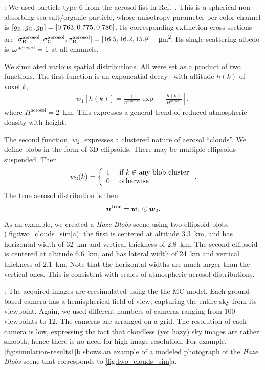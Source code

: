 \documentclass[10pt,letterpaper]{article}
\begin{document}
: We used particle-type 6 from the aerosol list
in Ref.~\cite{Martonchik2009}. This is a spherical non-absorbing
sea-salt/organic particle, whose anisotropy parameter per color
channel is $[g_{\rm R},g_{\rm G},g_{\rm B}]=[0.763,0.775,0.786]$. Its
corresponding extinction cross sections are $[\sigma^{\rm
  aerosol}_{\rm R}, \sigma^{\rm aerosol}_{\rm G}, \sigma^{\rm
  aerosol}_{\rm
  B}]=[16.5,16.2,15.9]$~\si[sticky-per]{\per\micro\meter\squared}.
Its single-scattering albedo is $\varpi^{\rm aerosol}=1$ at all
channels.

We simulated various spatial distributions. All were set as a product
of two functions. The first function is an exponential
decay~\cite{Levi1980} with altitude $h(k)$ of voxel $k$,
\begin{align}
  w_1[h(k)] = \frac{1} {n^{sea level}}
  \exp\left[-\frac{h(k)}{H^\mathrm{aerosol}}\right],
\end{align}
where $H^\mathrm{aerosol}=2$~\si{\km}. This expresses a general trend
of reduced atmospheric density with height.

The second function, $w_2$, expresses a clustered nature of aerosol
``clouds''. We define blobs in the form of 3D ellipsoids. There may be
multiple ellipsoids suspended.  Then
\begin{equation}
  w_2(k) =
  \left\{
    \begin{array}{ll}
      1  & \mbox{ if $k\in$ any blob cluster} \\
      0  & \mbox{ otherwise}
      \label{eq:f2}
    \end{array}
  \right.
  .
  \hspace{-0.05cm}
\end{equation}
The true aerosol distribution is then
\begin{equation}
  \label{eq:ntrue}
  {\bm n}^{\rm true}={\bm w}_1\odot {\bm w}_2  .
  \hspace{-0.05cm}
\end{equation}
As an example, we created a {\em Haze Blobs} scene using two ellipsoid
blobs (\cref{fig:two_clouds_sim}a): the first is centered at altitude
\SI{3.3}{\km}, and has horizontal width of \SI{32}{\km} and vertical
thickness of \SI{2.8}{\km}. The second ellipsoid is centered at
altitude \SI{6.6}{\km}, and has lateral width of \SI{24}{\km} and
vertical thickness of \SI{2.1}{\km}. Note that the horizontal widths
are much larger than the vertical ones. This is consistent with scales
of atmospheric aerosol distributions.

: The acquired images are cresimulated using the the MC model.
Each ground-based camera has a hemispherical field of view, capturing
the entire sky from its viewpoint. Again, we used different numbers of
cameras ranging from 100 viewpoints to 12. The cameras are arranged on
a grid.  The resolution of each camera is low, expressing the fact
that cloudless (yet hazy) sky images are rather smooth, hence there is
no need for high image resolution.  For example,
\cref{fig:simulation-results1}b shows an example of a modeled
photograph
of the {\em Haze Blobs} scene that corresponds to
\cref{fig:two_clouds_sim}a.
\end{document}
